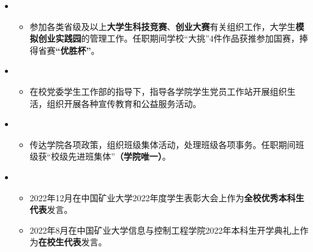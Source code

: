 \begin{itemize}[leftmargin=*]
	\item
	{\small
  	\begin{itemize}
  		\item 参加各类省级及以上\textbf{大学生科技竞赛}、\textbf{创业大赛}有关组织工作，大学生\textbf{模拟创业实践园}的管理工作。任职期间学校“大挑”4件作品获推参加国赛，捧得省赛\textbf{“优胜杯”}。
  	\end{itemize}
  }
  
  	\item
	{\small
  	\begin{itemize}
  		\item 在校党委学生工作部的指导下，指导各学院学生党员工作站开展组织生活，组织开展各种宣传教育和公益服务活动。
  	\end{itemize}
  }

    	\item
	{\small
  	\begin{itemize}
  		\item 传达学院各项政策，组织班级集体活动，处理班级各项事务。任职期间班级获“校级先进班集体”\textbf{（学院唯一）}。
  	\end{itemize}
  }

    	\item
	{\small
  	\begin{itemize}
         	\item 2022年12月在中国矿业大学2022年度学生表彰大会上作为\textbf{全校优秀本科生代表}发言。
  		\item 2022年8月在中国矿业大学信息与控制工程学院2022年本科生开学典礼上作为\textbf{在校生代表}发言。
  	\end{itemize}
  }
\end{itemize}



